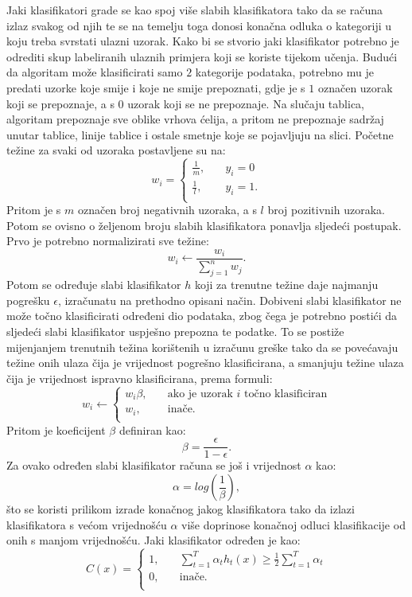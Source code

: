 \documentclass[times, utf8, zavrsni, numeric]{fer}
\begin{document}
Jaki klasifikatori grade se kao spoj više slabih klasifikatora tako da se računa izlaz svakog od njih te se na temelju toga donosi konačna odluka o kategoriji u koju treba svrstati ulazni uzorak.
Kako bi se stvorio jaki klasifikator potrebno je odrediti skup labeliranih ulaznih primjera koji se koriste tijekom učenja.
Budući da algoritam može klasificirati samo $2$ kategorije podataka, potrebno mu je predati uzorke koje smije i koje ne smije prepoznati, gdje je s $1$ označen uzorak koji se prepoznaje, a s $0$ uzorak koji se ne prepoznaje.
Na slučaju tablica, algoritam prepoznaje sve oblike vrhova ćelija, a pritom ne prepoznaje sadržaj unutar tablice, linije tablice i ostale smetnje koje se pojavljuju na slici.
Početne težine za svaki od uzoraka postavljene su na: 
\[
    w_i = 
    \begin{cases}
    \frac{1}{m}, & \quad y_i = 0\\
    \frac{1}{l}, & \quad y_i = 1.\\
    \end{cases}
\]
Pritom je s $m$ označen broj negativnih uzoraka, a s $l$ broj pozitivnih uzoraka.
Potom se ovisno o željenom broju slabih klasifikatora ponavlja sljedeći postupak.
Prvo je potrebno normalizirati sve težine:
\[
    w_i \leftarrow \frac{w_i}{
        \displaystyle \sum_{j = 1}^{n}w_j
    }.
\]
Potom se određuje slabi klasifikator $h$ koji za trenutne težine daje najmanju pogrešku $\epsilon$, izračunatu na prethodno opisani način.
Dobiveni slabi klasifikator ne može točno klasificirati određeni dio podataka, zbog čega je potrebno postići da sljedeći slabi klasifikator uspješno prepozna te podatke.
To se postiže mijenjanjem trenutnih težina korištenih u izračunu greške tako da se povećavaju težine onih ulaza čija je vrijednost pogrešno klasificirana, a smanjuju težine ulaza čija je vrijednost ispravno klasificirana, prema formuli:
\[
    w_i \leftarrow 
    \begin{cases}
        w_i\beta, & \quad \text{ako je uzorak $i$ točno klasificiran}\\
        w_i, & \quad \text{inače.}\\
    \end{cases}
\]
Pritom je koeficijent $\beta$ definiran kao: 
\[
    \beta = \frac{\epsilon}{1 - \epsilon}.
\]
Za ovako određen slabi klasifikator računa se još i vrijednost $\alpha$ kao: 
\[
    \alpha = log(\frac{1}{\beta}),
\]
što se koristi prilikom izrade konačnog jakog klasifikatora tako da izlazi klasifikatora s većom vrijednošću $\alpha$ više doprinose konačnoj odluci klasifikacije od onih s manjom vrijednošću.
Jaki klasifikator određen je kao:
\[
    C(x) = 
    \begin{cases}
        1, & \quad 
            \displaystyle \sum_{t = 1}^{T}
            \alpha_th_t(x)
            \geq
            \frac{1}{2} \displaystyle \sum_{t = 1}^{T}\alpha_t\\
        0, & \quad \text{inače.}\\
    \end{cases}
\]
\end{document}
